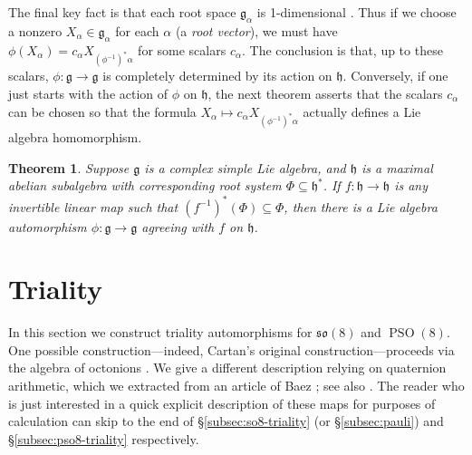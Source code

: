 \documentclass[reqno]{amsart}
\newtheorem{theorem}{Theorem}[section]
\theoremstyle{definition} \newtheorem{example}[theorem]{Example}
\newcommand{\PSO}{\operatorname{PSO}}
\newcommand{\so}{\mathfrak{so}}
\newcommand{\secsymbol}{§}
\newcommand{\g}{\mathfrak{g}}
\newcommand{\h}{\mathfrak{h}}
\begin{document}
The final key fact is that each root space $\g_\alpha$ is 1-dimensional \cite[\secsymbol 8.4]{humphreys}.  Thus if we choose a nonzero $X_\alpha \in \g_{\alpha}$ for each $\alpha$ (a \emph{root vector}), we must have $\phi(X_{\alpha}) = c_\alpha X_{(\phi^{-1})^* \alpha}$ for some scalars $c_\alpha$.  The conclusion is that, up to these scalars,  $\phi : \g \to \g$ is completely determined by its action on $\h$.  Conversely,  if one just starts with the action of $\phi$ on $\h$, the next theorem asserts that the scalars $c_\alpha$ can be chosen so that the formula $X_{\alpha} \mapsto c_\alpha X_{(\phi^{-1})^* \alpha}$ actually defines a Lie algebra homomorphism.
\begin{theorem} \cite[Ch.\ IV, 14.2]{humphreys} \label{thm:aut-extension}
Suppose $\g$ is a complex simple Lie algebra,  and $\h$ is a maximal abelian subalgebra with corresponding root system $\Phi \subseteq \h^*$. If $f : \h \to \h$ is any invertible linear map such that $(f^{-1})^*(\Phi) \subseteq \Phi$, then there is a Lie algebra automorphism $\phi : \g \to \g$ agreeing with $f$ on $\h$.
\end{theorem}


\section{Triality} \label{sec:triality}
In this section we construct triality automorphisms for $\so(8)$ and $\PSO(8)$. One possible construction---indeed, Cartan's original construction---proceeds via the algebra of octonions \cite[\secsymbol 8.3]{quaternions-octonions}. We give a different description relying on quaternion arithmetic, which we extracted from an article of Baez \cite{baez-triality}; see also \cite[Remark 4.5]{knus-tignol-triality}.  The reader who is just interested in a quick explicit description of these maps for purposes of calculation can skip to the end of \secsymbol\ref{subsec:so8-triality} (or \secsymbol\ref{subsec:pauli}) and \secsymbol\ref{subsec:pso8-triality} respectively.
\end{document}
